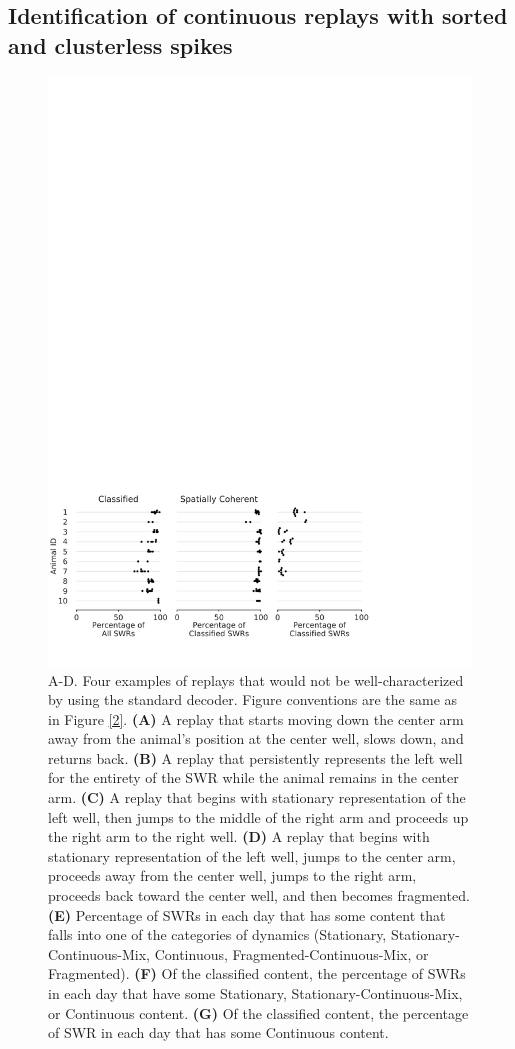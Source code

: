 \documentclass[times, twoside]{zHenriquesLab-StyleBioRxiv}
\begin{document}
\subsection*{Identification of continuous replays with sorted and clusterless spikes}

\begin{figure}%
\centering
\includegraphics[width=0.80\linewidth]{figures/Figure3/Figure3_v5}
\caption{A-D. Four examples of replays that would not be well-characterized by using the standard decoder. Figure conventions are the same as in Figure \ref{2}. \textbf{(A)} A replay that starts moving down the center arm away from the animal's position at the center well, slows down, and returns back. \textbf{(B)} A replay that persistently represents the left well for the entirety of the SWR while the animal remains in the center arm. \textbf{(C)} A replay that begins with stationary representation of the left well, then jumps to the middle of the right arm and proceeds up the right arm to the right well. \textbf{(D)} A replay that begins with stationary representation of the left well, jumps to the center arm, proceeds away from the center well, jumps to the right arm, proceeds back toward the center well, and then becomes fragmented. \textbf{(E)} Percentage of SWRs in each day that has some content that falls into one of the categories of dynamics (Stationary, Stationary-Continuous-Mix, Continuous, Fragmented-Continuous-Mix, or Fragmented). \textbf{(F)} Of the classified content, the percentage of SWRs in each day that have some Stationary, Stationary-Continuous-Mix, or Continuous content. \textbf{(G)} Of the classified content, the percentage of SWR in each day that has some Continuous content.
}
\label{3}
\end{figure}
\end{document}
